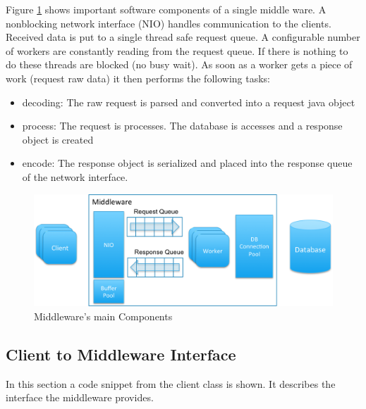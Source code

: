 \documentclass[a4paper]{article}
\begin{document}
Figure \ref{fig:middleware-threading} shows important software components of a single middle ware. A nonblocking network interface (NIO) handles communication to the clients. Received data is put to a single thread safe request queue. A configurable number of workers are constantly reading from the request queue. If there is nothing to do these threads are blocked (no busy wait). As soon as a worker gets a piece of work (request raw data) it then performs the following tasks:
\begin{itemize}
\item decoding: The raw request is parsed and converted into a request java object
\item process: The request is processes. The database is accesses and a response object is created
\item encode: The response object is serialized and placed into the response queue of the network interface.
\end{itemize}


\begin{figure}[H]
	\begin{center}
    \includegraphics[scale=0.6]{../drawings/broker-threading.png}
  \end{center}
  \caption{Middleware's main Components}
  \label{fig:middleware-threading}
\end{figure}

\subsection{Client to Middleware Interface}
In this section a code snippet from the client class is shown. It describes the interface the middleware provides.



\end{document}
